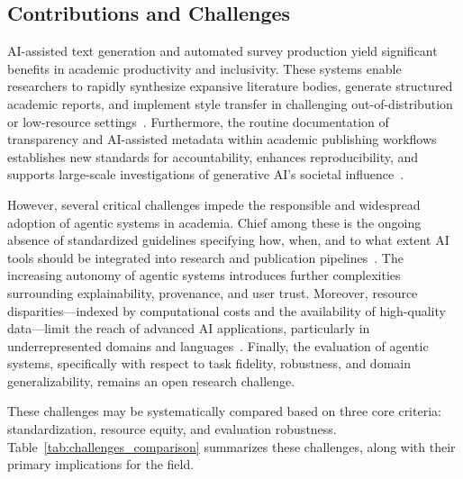 \documentclass[11pt]{article}
\begin{document}
\subsection{Contributions and Challenges}

AI-assisted text generation and automated survey production yield significant benefits in academic productivity and inclusivity. These systems enable researchers to rapidly synthesize expansive literature bodies, generate structured academic reports, and implement style transfer in challenging out-of-distribution or low-resource settings~\cite{ref104,ref105,ref106}. Furthermore, the routine documentation of transparency and AI-assisted metadata within academic publishing workflows establishes new standards for accountability, enhances reproducibility, and supports large-scale investigations of generative AI’s societal influence~\cite{ref101,ref105}.

However, several critical challenges impede the responsible and widespread adoption of agentic systems in academia. Chief among these is the ongoing absence of standardized guidelines specifying how, when, and to what extent AI tools should be integrated into research and publication pipelines~\cite{ref101,ref106}. The increasing autonomy of agentic systems introduces further complexities surrounding explainability, provenance, and user trust. Moreover, resource disparities—indexed by computational costs and the availability of high-quality data—limit the reach of advanced AI applications, particularly in underrepresented domains and languages~\cite{ref103,ref104,ref106}. Finally, the evaluation of agentic systems, specifically with respect to task fidelity, robustness, and domain generalizability, remains an open research challenge.

These challenges may be systematically compared based on three core criteria: standardization, resource equity, and evaluation robustness. Table~\ref{tab:challenges_comparison} summarizes these challenges, along with their primary implications for the field.
\end{document}
